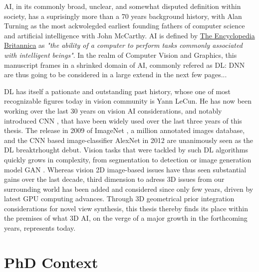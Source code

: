 \ac{AI}, in its commonly broad, unclear, and somewhat disputed definition within society, has a suprisingly more than a 70 years background history, with Alan Turning as the most ackwolegded earliest founding fathers of computer science \citep{turing1950computing} and artificial intelligence with John McCarthy. \ac{AI} is defined by \href{https://www.britannica.com/technology/artificial-intelligence}{The Encyclopedia Britannica} as \textit{"the ability of a computer to perform tasks commonly associated with intelligent beings"}. In the realm of Computer Vision and Graphics, this manuscript frames in a shrinked domain of \ac{AI}, commonly refered as \ac{DL}: \ac{DNN} are thus going to be considered in a large extend in the next few pages... 

\ac{DL} has itself a pationate and outstanding past history, whose one of most recognizable figures today in vision community is Yann LeCun. He has now been working over the last 30 years on vision \ac{AI} considerations, and notably introduced \ac{CNN} \citep{lecun1998gradient}, that have been widely used over the last three years of this thesis. The release in 2009 of ImageNet \citep{deng2009imagenet}, a million annotated images database, and the \ac{CNN} based image-classifier AlexNet \citep{krizhevsky2012imagenet} in 2012 are unanimously seen as the \ac{DL} breaktrhought debut. Vision tasks that were tackled by such \ac{DL} algorithms quickly grows in complexity, from segmentation \citep{long2015fully} to detection \citep{girshick2015fast} or image generation model \ac{GAN} \citep{goodfellow2014generative}. Whereas vision 2D image-based issues have thus seen substantial gains over the last decade, third dimension to adress 3D issues from our surrounding world has been added and considered since only few years, driven by latest \ac{GPU} computing advances. Through 3D geometrical prior integration considerations for novel view synthesis, this thesis thereby finds its place within the premises of what 3D AI, on the verge of a major growth in the forthcoming years, represents today.  


\section{PhD Context}

